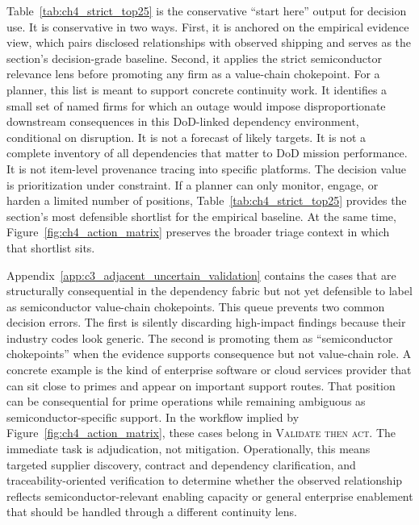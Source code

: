 Table~\ref{tab:ch4_strict_top25} is the conservative ``start here'' output for decision use. It is conservative in two ways. First, it is anchored on the empirical evidence view, which pairs disclosed relationships with observed shipping and serves as the section's decision-grade baseline. Second, it applies the strict semiconductor relevance lens before promoting any firm as a value-chain chokepoint. For a planner, this list is meant to support concrete continuity work. It identifies a small set of named firms for which an outage would impose disproportionate downstream consequences in this DoD-linked dependency environment, conditional on disruption. It is not a forecast of likely targets. It is not a complete inventory of all dependencies that matter to DoD mission performance. It is not item-level provenance tracing into specific platforms. The decision value is prioritization under constraint. If a planner can only monitor, engage, or harden a limited number of positions, Table~\ref{tab:ch4_strict_top25} provides the section's most defensible shortlist for the empirical baseline. At the same time, Figure~\ref{fig:ch4_action_matrix} preserves the broader triage context in which that shortlist sits.

Appendix~\ref{app:c3_adjacent_uncertain_validation} contains the cases that are structurally consequential in the dependency fabric but not yet defensible to label as semiconductor value-chain chokepoints. This queue prevents two common decision errors. The first is silently discarding high-impact findings because their industry codes look generic. The second is promoting them as ``semiconductor chokepoints'' when the evidence supports consequence but not value-chain role. A concrete example is the kind of enterprise software or cloud services provider that can sit close to primes and appear on important support routes. That position can be consequential for prime operations while remaining ambiguous as semiconductor-specific support. In the workflow implied by Figure~\ref{fig:ch4_action_matrix}, these cases belong in \textsc{Validate then act}. The immediate task is adjudication, not mitigation. Operationally, this means targeted supplier discovery, contract and dependency clarification, and traceability-oriented verification to determine whether the observed relationship reflects semiconductor-relevant enabling capacity or general enterprise enablement that should be handled through a different continuity lens.


